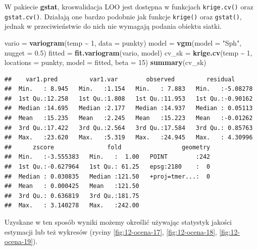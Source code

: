 \documentclass[
  paper=6in:9in,pagesize=pdftex,headinclude=on,footinclude=on,10pt]{scrbook}
\newenvironment{Shaded}{\begin{snugshade}}{\end{snugshade}}
\newcommand{\AttributeTok}[1]{\textcolor[rgb]{0.13,0.29,0.53}{#1}}
\newcommand{\DecValTok}[1]{\textcolor[rgb]{0.00,0.00,0.81}{#1}}
\newcommand{\FloatTok}[1]{\textcolor[rgb]{0.00,0.00,0.81}{#1}}
\newcommand{\FunctionTok}[1]{\textcolor[rgb]{0.13,0.29,0.53}{\textbf{#1}}}
\newcommand{\NormalTok}[1]{#1}
\newcommand{\OtherTok}[1]{\textcolor[rgb]{0.56,0.35,0.01}{#1}}
\newcommand{\SpecialCharTok}[1]{\textcolor[rgb]{0.81,0.36,0.00}{\textbf{#1}}}
\newcommand{\StringTok}[1]{\textcolor[rgb]{0.31,0.60,0.02}{#1}}
\begin{document}
W pakiecie \textbf{gstat}, kroswalidacja LOO jest dostępna w funkcjach \texttt{krige.cv()} oraz \texttt{gstat.cv()}.
Działają one bardzo podobnie jak funkcje \texttt{krige()} oraz \texttt{gstat()}, jednak w przeciwieństwie do nich nie wymagają podania obiektu siatki.

\begin{Shaded}
\begin{Highlighting}[]
\NormalTok{vario }\OtherTok{=} \FunctionTok{variogram}\NormalTok{(temp }\SpecialCharTok{\textasciitilde{}} \DecValTok{1}\NormalTok{, }\AttributeTok{data =}\NormalTok{ punkty)}
\NormalTok{model }\OtherTok{=} \FunctionTok{vgm}\NormalTok{(}\AttributeTok{model =} \StringTok{"Sph"}\NormalTok{, }\AttributeTok{nugget =} \FloatTok{0.5}\NormalTok{)}
\NormalTok{fitted }\OtherTok{=} \FunctionTok{fit.variogram}\NormalTok{(vario, model)}
\NormalTok{cv\_sk }\OtherTok{=} \FunctionTok{krige.cv}\NormalTok{(temp }\SpecialCharTok{\textasciitilde{}} \DecValTok{1}\NormalTok{,}
                 \AttributeTok{locations =}\NormalTok{ punkty,}
                 \AttributeTok{model =}\NormalTok{ fitted,}
                 \AttributeTok{beta =} \DecValTok{15}\NormalTok{)}
\FunctionTok{summary}\NormalTok{(cv\_sk)}
\end{Highlighting}
\end{Shaded}

\begin{verbatim}
##    var1.pred         var1.var        observed         residual       
##  Min.   : 8.945   Min.   :1.154   Min.   : 7.883   Min.   :-5.08278  
##  1st Qu.:12.258   1st Qu.:1.808   1st Qu.:11.953   1st Qu.:-0.90162  
##  Median :14.695   Median :2.177   Median :14.937   Median : 0.05113  
##  Mean   :15.235   Mean   :2.245   Mean   :15.223   Mean   :-0.01262  
##  3rd Qu.:17.422   3rd Qu.:2.564   3rd Qu.:17.584   3rd Qu.: 0.85763  
##  Max.   :23.620   Max.   :5.319   Max.   :24.945   Max.   : 4.30996  
##      zscore               fold                 geometry  
##  Min.   :-3.555383   Min.   :  1.00   POINT        :242  
##  1st Qu.:-0.627964   1st Qu.: 61.25   epsg:2180    :  0  
##  Median : 0.030835   Median :121.50   +proj=tmer...:  0  
##  Mean   : 0.000425   Mean   :121.50                      
##  3rd Qu.: 0.636819   3rd Qu.:181.75                      
##  Max.   : 3.140278   Max.   :242.00
\end{verbatim}

Uzyskane w ten sposób wyniki możemy określić używając statystyk jakości estymacji lub też wykresów (ryciny \ref{fig:12-ocena-17}, \ref{fig:12-ocena-18}, \ref{fig:12-ocena-19}).
\end{document}
